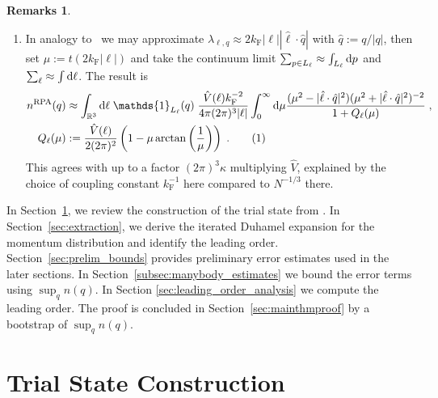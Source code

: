 \documentclass[12pt,a4paper]{article}
\numberwithin{equation}{section}
\newcommand{\1}{\mathbb{I}}
\renewcommand{\b}{\textnormal{b}}
\newcommand{\corr}{\textnormal{corr}}
\newcommand{\di}{\textnormal{d}}
\newcommand{\ex}{\mathrm{ex}}
\newcommand{\F}{\mathrm{F}}
\newcommand{\RPA}{\mathrm{RPA}}
\newcommand{\tagg}[1]{ \stepcounter{equation} \tag{\theequation}
\label{#1} } %
\newcommand{\R}{\mathbb{R}}
\theoremstyle{plain}
\theoremstyle{definition}
\newtheorem*{remarks}{Remarks}
\theoremstyle{remark}
\theoremstyle{plain}
\theoremstyle{definition}
\theoremstyle{remark}
\begin{document}
\begin{remarks}
\begin{enumerate}


\item In analogy to~\cite[Section~1.1]{BL25} we may approximate $ \lambda_{\ell,q} \approx 2 k_{\F} |\ell| |\hat{\ell} \cdot \hat{q}| $ with $ \hat{q} := {q}/{|q|} $, then set $ \mu := t (2 k_{\F} |\ell|) $ and take the continuum limit $ \sum_{p \in L_\ell} \approx \int_{L_\ell} \di p $ and $ \sum_\ell \approx \int \di \ell $. The result is
\begin{align*}
	n^{\RPA}(q)
	&\approx \int_{\R^3} \di \ell \; \mathds{1}_{L_{\ell}}(q) \; \frac{\hat{V}(\ell) k_{\F}^{-2}}{4 \pi (2 \pi)^3 |\ell|}
		\int_0^\infty \di \mu \frac{(\mu^2-|\hat{\ell} \cdot \hat{q}|^2) (\mu^2 + |\hat{\ell} \cdot \hat{q}|^2)^{-2}}{1 + Q_\ell(\mu)} \;, \\
	Q_\ell(\mu) &:= \frac{\hat{V}(\ell)}{2 (2 \pi)^2} \left( 1 - \mu \arctan \left( \frac{1}{\mu} \right) \right) \;. \tagg{eq:Q}
\end{align*}
This agrees with \cite{BL25} up to a factor $ (2 \pi)^3 \kappa $ multiplying $\hat{V}$, explained by the choice of coupling constant $k_\F^{-1}$ here compared to $N^{-1/3}$ there.
\end{enumerate}
\end{remarks}

In Section~\ref{sec:trialstate}, we review the construction of the trial state from \cite{CHN23}. In Section~\ref{sec:extraction}, we derive the iterated Duhamel expansion for the momentum distribution and identify the leading order. Section~\ref{sec:prelim_bounds} provides preliminary error estimates used in the later sections. In Section~\ref{subsec:manybody_estimates} we bound the error terms using $\sup_q n(q)$. In Section \ref{sec:leading_order_analysis} we compute the leading order. The proof is concluded in Section~\ref{sec:mainthmproof} by a bootstrap of $\sup_q n(q)$.





\section{Trial State Construction}
\label{sec:trialstate}
\end{document}
